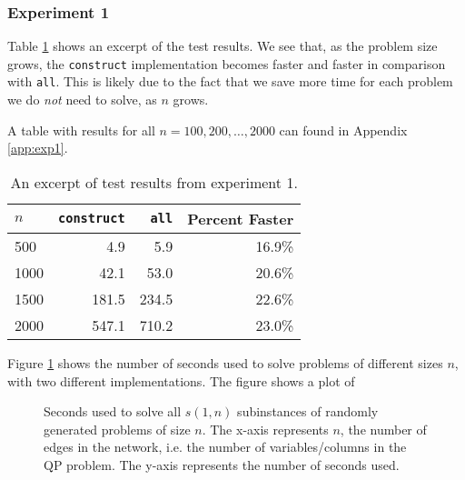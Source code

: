 \subsubsection{Experiment 1}
Table \ref{table:expone} shows an excerpt of the test results.
We see that, as the problem size grows, the \texttt{construct} implementation
becomes faster and faster in comparison with \texttt{all}.
This is likely due to the fact that we save more time for each problem we do
\emph{not} need to solve, as $n$ grows.

A table with results for all $n=100,200,\ldots,2000$ can found in Appendix
\ref{app:exp1}.

\begin{table}[ht!]
    \centering
    \caption{An excerpt of test results from experiment 1.}
\begin{tabular}{lrrr}
    $n$ & \texttt{construct} & \texttt{all} & Percent Faster \\ \hline
    500 & 4.9                & 5.9          & 16.9\% \\
   1000 & 42.1               & 53.0         & 20.6\% \\
   1500 & 181.5              & 234.5        & 22.6\% \\
   2000 & 547.1              & 710.2        & 23.0\%
\end{tabular}
\label{table:expone}
\end{table}

Figure \ref{fig:constructbone} shows the number of seconds used to solve problems
of different sizes $n$, with two different implementations.
The figure shows a plot of 
\begin{figure}[ht!]
    \centering
    
    \caption{Seconds used to solve all $s(1, n)$ subinstances of randomly
             generated problems of size $n$. The x-axis represents $n$, the
             number of edges in the network, i.e. the number of
             variables/columns in the QP problem. The y-axis represents the
             number of seconds used.}
    \label{fig:constructbone}
\end{figure}
